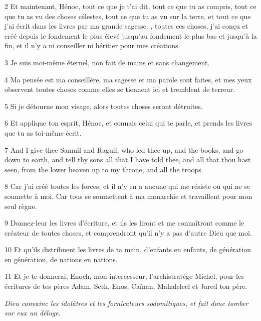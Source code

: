\par 2 Et maintenant, Hénoc, tout ce que je t'ai dit, tout ce que tu as compris, tout ce que tu as vu des choses célestes, tout ce que tu as vu sur la terre, et tout ce que j'ai écrit dans les livres par ma grande sagesse. , toutes ces choses, j'ai conçu et créé depuis le fondement le plus élevé jusqu'au fondement le plus bas et jusqu'à la fin, et il n'y a ni conseiller ni héritier pour mes créations.

\par 3 Je suis moi-même éternel, non fait de mains et sans changement.

\par 4 Ma pensée est ma conseillère, ma sagesse et ma parole sont faites, et mes yeux observent toutes choses comme elles se tiennent ici et tremblent de terreur.

\par 5 Si je détourne mon visage, alors toutes choses seront détruites.

\par 6 Et applique ton esprit, Hénoc, et connais celui qui te parle, et prends les livres que tu as toi-même écrit.

\par 7 And I give thee Samuil and Raguil, who led thee up, and the books, and go down to earth, and tell thy sons all that I have told thee, and all that thou hast seen, from the lower heaven up to my throne, and all the troops.

\par 8 Car j'ai créé toutes les forces, et il n'y en a aucune qui me résiste ou qui ne se soumette à moi. Car tous se soumettent à ma monarchie et travaillent pour mon seul règne.

\par 9 Donnez-leur les livres d'écriture, et ils les liront et me connaîtront comme le créateur de toutes choses, et comprendront qu'il n'y a pas d'autre Dieu que moi.

\par 10 Et qu'ils distribuent les livres de ta main, d'enfants en enfants, de génération en génération, de nations en nations.

\par 11 Et je te donnerai, Enoch, mon intercesseur, l'archistratège Michel, pour les écritures de tes pères Adam, Seth, Enos, Caïnan, Mahaleleel et Jared ton père.


\par \textit{Dieu convainc les idolâtres et les fornicateurs sodomitiques, et fait donc tomber sur eux un déluge.}

